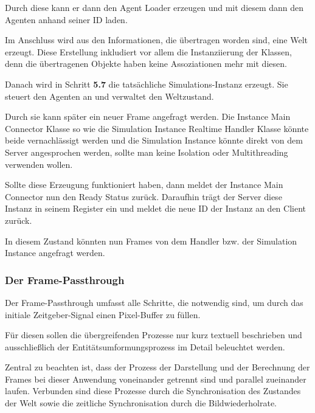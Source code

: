 Durch diese kann er dann den Agent Loader erzeugen und mit diesem dann den Agenten anhand seiner ID laden.

Im Anschluss wird aus den Informationen, die übertragen worden sind, eine Welt erzeugt.
Diese Erstellung inkludiert vor allem die Instanziierung der Klassen, denn die übertragenen Objekte haben keine Assoziationen mehr mit diesen.

Danach wird in Schritt \textbf{5.7} die tatsächliche Simulations-Instanz erzeugt.
Sie steuert den Agenten an und verwaltet den Weltzustand.

Durch sie kann später ein neuer Frame angefragt werden.
Die Instance Main Connector Klasse so wie die Simulation Instance Realtime Handler Klasse könnte beide vernachlässigt werden und die Simulation Instance könnte direkt von dem Server angesprochen werden, sollte man keine Isolation oder Multithreading verwenden wollen.

Sollte diese Erzeugung funktioniert haben, dann meldet der Instance Main Connector nun den Ready Status zurück.
Daraufhin trägt der Server diese Instanz in seinem Register ein und meldet die neue ID der Instanz an den Client zurück.

In diesem Zustand könnten nun Frames von dem Handler bzw. der Simulation Instance angefragt werden.

\FloatBarrier

\subsubsection{Der Frame-Passthrough}

\newcommand{\processbegin}[2]{\item[$\mapsto$] \textbf{\textit{#1} #2:}}
\newcommand{\processstep}[2]{\item[$\rightarrow$] \textbf{\textit{#1} #2:}}

Der Frame-Passthrough umfasst alle Schritte, die notwendig sind, um durch das initiale Zeitgeber-Signal einen Pixel-Buffer zu füllen.

Für diesen sollen die übergreifenden Prozesse nur kurz textuell beschrieben und ausschließlich der Entitätsumformungsprozess im Detail beleuchtet werden.

Zentral zu beachten ist, dass der Prozess der Darstellung und der Berechnung der Frames bei dieser Anwendung voneinander getrennt sind und parallel zueinander laufen.
Verbunden sind diese Prozesse durch die Synchronisation des Zustandes der Welt sowie die zeitliche Synchronisation durch die Bildwiederholrate.

